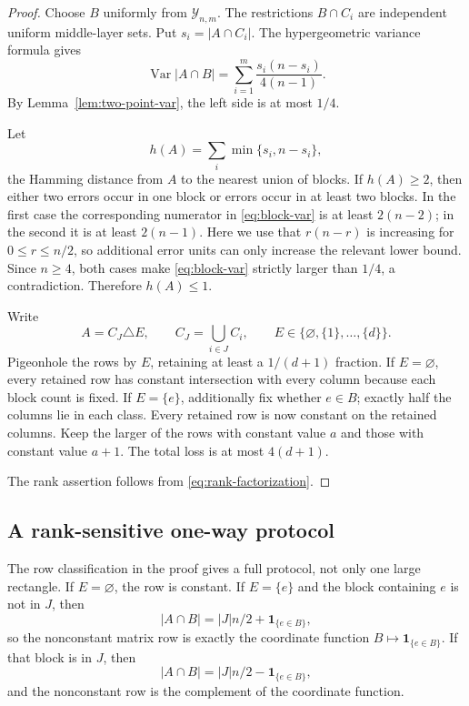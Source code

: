 \documentclass[11pt]{article}
\theoremstyle{definition}
\theoremstyle{remark}
\newcommand{\cY}{\mathcal Y}
\newcommand{\1}{\mathbf 1}
\newcommand{\Var}{\operatorname{Var}}
\begin{document}
\begin{proof}
Choose $B$ uniformly from $\cY_{n,m}$.  The restrictions $B\cap C_i$ are
independent uniform middle-layer sets.  Put $s_i=|A\cap C_i|$.  The
hypergeometric variance formula gives
\begin{equation}\label{eq:block-var}
 \Var|A\cap B|
 =\sum_{i=1}^m\frac{s_i(n-s_i)}{4(n-1)}.
\end{equation}
By Lemma~\ref{lem:two-point-var}, the left side is at most $1/4$.

Let
\[
 h(A)=\sum_i\min\{s_i,n-s_i\},
\]
the Hamming distance from $A$ to the nearest union of blocks.  If
$h(A)\ge2$, then either two errors occur in one block or errors occur in at
least two blocks.  In the first case the corresponding numerator in
\eqref{eq:block-var} is at least $2(n-2)$; in the second it is at least
$2(n-1)$.  Here we use that $r(n-r)$ is increasing for
$0\le r\le n/2$, so additional error units can only increase the relevant
lower bound.  Since $n\ge4$, both cases make \eqref{eq:block-var} strictly
larger than $1/4$, a contradiction.  Therefore $h(A)\le1$.

Write
\[
 A=C_J\triangle E,
 \qquad C_J=\bigcup_{i\in J}C_i,
 \qquad E\in\{\varnothing,\{1\},\ldots,\{d\}\}.
\]
Pigeonhole the rows by $E$, retaining at least a $1/(d+1)$ fraction.  If
$E=\varnothing$, every retained row has constant intersection with every
column because each block count is fixed.  If $E=\{e\}$, additionally fix
whether $e\in B$; exactly half the columns lie in each class.  Every retained
row is now constant on the retained columns.  Keep the larger of the rows
with constant value $a$ and those with constant value $a+1$.  The total loss
is at most $4(d+1)$.

The rank assertion follows from \eqref{eq:rank-factorization}.
\end{proof}

\subsection{A rank-sensitive one-way protocol}

The row classification in the proof gives a full protocol, not only one
large rectangle.  If $E=\varnothing$, the row is constant.  If
$E=\{e\}$ and the block containing $e$ is not in $J$, then
\[
 |A\cap B|=|J|n/2+\1_{\{e\in B\}},
\]
so the nonconstant matrix row is exactly the coordinate function
$B\mapsto\1_{\{e\in B\}}$.  If that block is in $J$, then
\[
 |A\cap B|=|J|n/2-\1_{\{e\in B\}},
\]
and the nonconstant row is the complement of the coordinate function.
\end{document}
